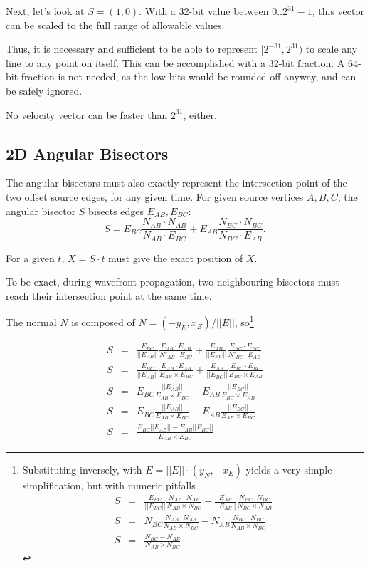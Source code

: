 \documentclass[12pt,a4paper,oneside,openany]{article}
\begin{document}
Next, let's look at $S = (1,0)$. With a 32-bit value between $0..2^{31}-1$, this vector can be scaled to the full range of allowable values.

Thus, it is necessary and sufficient to be able to represent $[2^{-31}, 2^{31})$ to scale any line to any point on itself. This can be accomplished with a 32-bit fraction. A 64-bit fraction is not needed, as the low bits would be rounded off anyway, and can be safely ignored.

No velocity vector can be faster than $2^{31}$, either.

\subsection{2D Angular Bisectors}

The angular bisectors must also exactly represent the intersection point of the two offset source edges, for any given time. For given source vertices $A,B,C$, the angular bisector $S$ bisects edges $E_{AB}, E_{BC}$:
$$ S = E_{BC} \frac{N_{AB} \cdot N_{AB}}{N_{AB} \cdot E_{BC}} +  E_{AB} \frac{N_{BC} \cdot N_{BC}}{N_{BC} \cdot E_{AB}}.$$

For a given $t$, $X = S \cdot t$ must give the exact position of $X$.

To be exact, during wavefront propagation, two neighbouring bisectors must reach their intersection point at the same time.

The normal $N$ is composed of $N = (-y_E, x_E) / ||E||$, so\footnote{
Substituting inversely, with $E = ||E||\cdot(y_N, -x_E)$ yields a very simple simplification, but with numeric pitfalls
\begin{eqnarray*}
S &=& \frac{E_{BC}}{||E_{BC}||} \frac{N_{AB} \cdot N_{AB}}{N_{AB} \times N_{BC}} +  \frac{E_{AB}}{||E_{AB}||} \frac{N_{BC} \cdot N_{BC}}{N_{BC} \times N_{AB}} \\
S &=& {N_{BC}} \frac{N_{AB} \cdot N_{AB}}{N_{AB} \times N_{BC}} - N_{AB} \frac{N_{BC} \cdot N_{BC}}{N_{AB} \times N_{BC}} \\
S &=& \frac{N_{BC} - N_{AB}}{N_{AB} \times N_{BC}}
\end{eqnarray*}
}

\begin{eqnarray*}
S &=& \frac{E_{BC}}{|| E_{AB} ||} \frac{E_{AB} \cdot E_{AB}}{N'_{AB} \cdot E_{BC}} +  \frac{E_{AB}}{|| E_{BC} ||} \frac{E_{BC} \cdot E_{BC}}{N'_{BC} \cdot E_{AB}} \\
S &=& \frac{E_{BC}}{|| E_{AB} ||} \frac{E_{AB} \cdot E_{AB}}{E_{AB} \times E_{BC}} +  \frac{E_{AB}}{|| E_{BC} ||} \frac{E_{BC} \cdot E_{BC}}{E_{BC} \times E_{AB}} \\
S &=& E_{BC} \frac{|| E_{AB} ||}{E_{AB} \times E_{BC}} +  E_{AB} \frac{|| E_{BC} ||}{E_{BC} \times E_{AB}} \\
S &=& E_{BC} \frac{|| E_{AB} ||}{E_{AB} \times E_{BC}} - E_{AB} \frac{|| E_{BC} ||}{E_{AB} \times E_{BC}} \\
S &=& \frac{E_{BC}|| E_{AB} || - E_{AB} || E_{BC} ||}{E_{AB} \times E_{BC}}
\end{eqnarray*}
\end{document}
